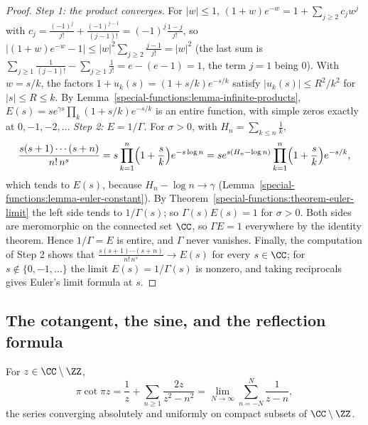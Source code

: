\begin{proof}
\emph{Step 1: the product converges.} For $|w| \leq 1$, $(1 + w)e^{-w} = 1 + \sum_{j \geq 2}c_jw^j$ with $c_j = \frac{(-1)^j}{j!} + \frac{(-1)^{j-1}}{(j - 1)!} = (-1)^j\frac{1 - j}{j!}$, so
$|(1 + w)e^{-w} - 1| \leq |w|^2\sum_{j \geq 2}\frac{j - 1}{j!} = |w|^2$ (the last sum is $\sum_{j \geq 1}\frac{1}{(j - 1)!} - \sum_{j \geq 1}\frac1{j!} = e - (e - 1) = 1$, the term $j = 1$ being $0$). With
$w = s/k$, the factors $1 + u_k(s) = (1 + s/k)e^{-s/k}$ satisfy $|u_k(s)| \leq R^2/k^2$ for $|s| \leq R \leq k$. By Lemma~\ref{special-functions:lemma-infinite-products}, $E(s) = se^{\gamma s}\prod_k(1 + s/k)e^{-s/k}$
is an entire function, with simple zeros exactly at $0, -1, -2, \ldots$
\emph{Step 2: $E = 1/\Gamma$.} For $\sigma > 0$, with $H_n = \sum_{k \leq n}\frac1k$,
\[
\frac{s(s + 1)\cdots(s + n)}{n!\,n^s} = s\prod_{k=1}^n\Bigl(1 + \frac sk\Bigr)e^{-s\log n} = se^{s(H_n - \log n)}\prod_{k=1}^n\Bigl(1 + \frac sk\Bigr)e^{-s/k},
\]
which tends to $E(s)$, because $H_n - \log n \to \gamma$ (Lemma~\ref{special-functions:lemma-euler-constant}). By Theorem~\ref{special-functions:theorem-euler-limit} the left side
tends to $1/\Gamma(s)$; so $\Gamma(s)E(s) = 1$ for $\sigma > 0$. Both sides are meromorphic on the connected set $\CC$, so $\Gamma E = 1$ everywhere by the identity theorem. Hence $1/\Gamma = E$ is
entire, and $\Gamma$ never vanishes. Finally, the computation of Step 2 shows that $\frac{s(s + 1)\cdots(s + n)}{n!\,n^s} \to E(s)$ for every $s \in \CC$; for $s \notin \{0, -1, \ldots\}$ the limit
$E(s) = 1/\Gamma(s)$ is nonzero, and taking reciprocals gives Euler's limit formula at $s$.
\end{proof}

\subsection{The cotangent, the sine, and the reflection formula}\label{special-functions:subsection-cotangent}

\begin{theorem}[Euler]\label{special-functions:theorem-cotangent}
For $z \in \CC \setminus \ZZ$,
\[
\pi\cot\pi z = \frac1z + \sum_{n \geq 1}\frac{2z}{z^2 - n^2} = \lim_{N \to \infty}\sum_{n = -N}^N\frac{1}{z - n},
\]
the series converging absolutely and uniformly on compact subsets of $\CC \setminus \ZZ$.
\end{theorem}

